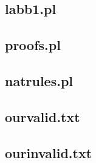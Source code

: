 \documentclass[a4paper,10.5pt]{article}
\begin{document}
\subsection{labb1.pl}


\newpage
\subsection{proofs.pl}


\newpage
\subsection{natrules.pl}


\newpage
\subsection{ourvalid.txt}


\bigskip
\subsection{ourinvalid.txt}

\end{document}
